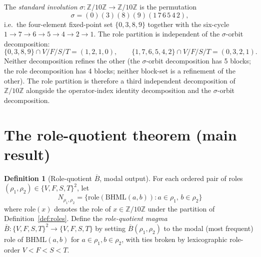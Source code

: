 \documentclass[11pt,reqno]{amsart}
\theoremstyle{plain}
\theoremstyle{definition}
\newtheorem{definition}[theorem]{Definition}
\theoremstyle{remark}
\newcommand{\Z}{\mathbb{Z}}
\newcommand{\BH}{\mathrm{BHML}}
\newcommand{\Bbar}{\overline{B}}
\begin{document}
The \emph{standard involution} $\sigma : \Z/10\Z \to \Z/10\Z$ is the
permutation
\[
\sigma = (0)(3)(8)(9)(1\, 7\, 6\, 5\, 4\, 2),
\]
i.e.\ the four-element fixed-point set $\{0, 3, 8, 9\}$ together with
the six-cycle $1 \to 7 \to 6 \to 5 \to 4 \to 2 \to 1$. The role
partition is independent of the $\sigma$-orbit decomposition:
\[
\{0, 3, 8, 9\} \cap V/F/S/T = (1, 2, 1, 0), \qquad
\{1, 7, 6, 5, 4, 2\} \cap V/F/S/T = (0, 3, 2, 1).
\]
Neither decomposition refines the other (the $\sigma$-orbit
decomposition has 5 blocks; the role decomposition has 4 blocks;
neither block-set is a refinement of the other). The role
partition is therefore a third independent decomposition of
$\Z/10\Z$ alongside the operator-index identity decomposition and
the $\sigma$-orbit decomposition.

\section{The role-quotient theorem (main result)} \label{sec:role-quotient}

\begin{definition}[Role-quotient $\Bbar$, modal output] \label{def:role-quotient}
For each ordered pair of roles $(\rho_1, \rho_2) \in \{V, F, S, T\}^2$,
let
\[
N_{\rho_1, \rho_2} = \{ \mathrm{role}(\BH(a, b)) : a \in \rho_1, \, b \in \rho_2 \}
\]
where $\mathrm{role}(x)$ denotes the role of $x \in \Z/10\Z$ under
the partition of Definition~\ref{def:roles}. Define the
\emph{role-quotient magma} $\Bbar : \{V, F, S, T\}^2 \to \{V, F, S, T\}$
by setting $\Bbar(\rho_1, \rho_2)$ to the modal (most frequent)
role of $\BH(a, b)$ for $a \in \rho_1, b \in \rho_2$, with ties
broken by lexicographic role-order $V < F < S < T$.
\end{definition}
\end{document}
